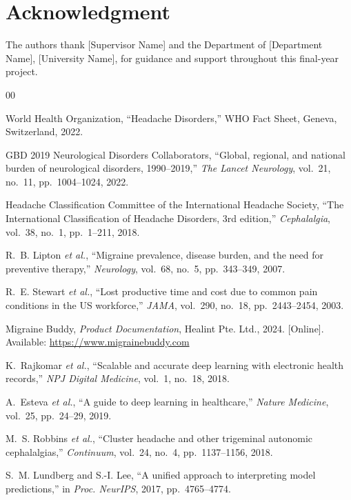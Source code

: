 \documentclass[conference,twocolumn,letterpaper]{IEEEtran}
\begin{document}
\section*{Acknowledgment}
The authors thank [Supervisor Name] and the Department of [Department Name], [University Name], for guidance and support throughout this final-year project.

\balance
\begin{thebibliography}{00}

World Health Organization, ``Headache Disorders,'' WHO Fact Sheet, Geneva, Switzerland, 2022.

GBD 2019 Neurological Disorders Collaborators, ``Global, regional, and national burden of neurological disorders, 1990--2019,'' \textit{The Lancet Neurology}, vol.~21, no.~11, pp.~1004--1024, 2022.

Headache Classification Committee of the International Headache Society, ``The International Classification of Headache Disorders, 3rd edition,'' \textit{Cephalalgia}, vol.~38, no.~1, pp.~1--211, 2018.

R.~B. Lipton \textit{et al.}, ``Migraine prevalence, disease burden, and the need for preventive therapy,'' \textit{Neurology}, vol.~68, no.~5, pp.~343--349, 2007.

R.~E. Stewart \textit{et al.}, ``Lost productive time and cost due to common pain conditions in the US workforce,'' \textit{JAMA}, vol.~290, no.~18, pp.~2443--2454, 2003.

Migraine Buddy, \textit{Product Documentation}, Healint Pte. Ltd., 2024. [Online]. Available: \url{https://www.migrainebuddy.com}

K.~Rajkomar \textit{et al.}, ``Scalable and accurate deep learning with electronic health records,'' \textit{NPJ Digital Medicine}, vol.~1, no.~18, 2018.

A.~Esteva \textit{et al.}, ``A guide to deep learning in healthcare,'' \textit{Nature Medicine}, vol.~25, pp.~24--29, 2019.

M.~S. Robbins \textit{et al.}, ``Cluster headache and other trigeminal autonomic cephalalgias,'' \textit{Continuum}, vol.~24, no.~4, pp.~1137--1156, 2018.

S.~M. Lundberg and S.-I. Lee, ``A unified approach to interpreting model predictions,'' in \textit{Proc. NeurIPS}, 2017, pp.~4765--4774.


\end{thebibliography}
\end{document}
